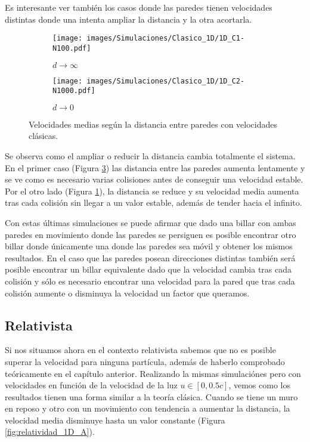 Es interesante ver también los casos donde las paredes tienen velocidades distintas donde una intenta ampliar la distancia y la otra acortarla. 

\begin{figure}[H]
    \begin{subfigure}[b]{0.5\textwidth}
        \centering
        \texttt{[image: images/Simulaciones/Clasico\_1D/1D\_C1-N100.pdf]}
        \caption{$d \rightarrow \infty$}
        \label{fig:clasico_distancia_infinito}
    \end{subfigure}
    \hfill
    \begin{subfigure}[b]{0.5\textwidth}
        \centering
        \texttt{[image: images/Simulaciones/Clasico\_1D/1D\_C2-N1000.pdf]}
        \caption{$d \rightarrow 0$}
        \label{fig:clasico_distancia_cero}
    \end{subfigure}
    \caption{Velocidades medias según la distancia entre paredes con velocidades clásicas.}
\end{figure}

Se observa como el ampliar o reducir la distancia cambia totalmente el sistema. En el primer caso (Figura \ref{fig:clasico_distancia_cero}) las distancia entre las paredes aumenta lentamente y se ve como es necesario varias colisiones antes de conseguir una velocidad estable. Por el otro lado (Figura \ref{fig:clasico_distancia_infinito}), la distancia se reduce y su velocidad media aumenta tras cada colisión sin llegar a un valor estable, además de tender hacia el infinito. 

\vspace{3mm}

Con estas últimas simulaciones se puede afirmar que dado una billar con ambas paredes en movimiento donde las paredes se persiguen es posible encontrar otro billar donde únicamente una donde las paredes sea móvil y obtener los mismos resultados. En el caso que las paredes posean direcciones distintas también será posible encontrar un billar equivalente dado que la velocidad cambia tras cada colisión y sólo es necesario encontrar una velocidad para la pared que tras cada colisión aumente o disminuya la velocidad un factor que queramos. 

\subsection{Relativista}

Si nos situamos ahora en el contexto relativista sabemos que no es posible superar la velocidad para ninguna partícula, además de haberlo comprobado teóricamente en el capítulo anterior. Realizando la mismas simulaciónes pero con velocidades en función de la velocidad de la luz \( u \in [0, 0.5c] \), vemos como los resultados tienen una forma similar a la teoría clásica. Cuando se tiene un muro en reposo y otro con un movimiento con tendencia a aumentar la distancia, la velocidad media disminuye hasta un valor constante (Figura \ref{fig:relatividad_1D_A}). 

